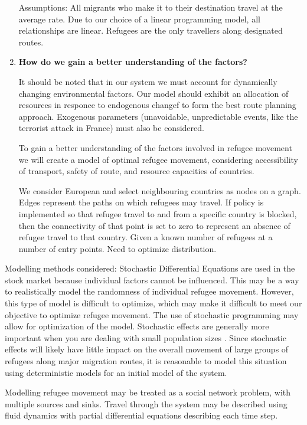 \documentclass{article}
\begin{document}
\begin{enumerate}
    Assumptions: All migrants who make it to their destination travel at the average rate. Due to our choice of a linear programming model, all relationships are linear. Refugees are the only travellers along designated routes.

    \item {\bf How do we gain a better understanding of the factors?}

    It should be noted that in our system we must account for dynamically changing environmental factors. Our model should exhibit an allocation of resources in responce to endogenous changef to form the best route planning approach. Exogenous parameters (unavoidable, unpredictable events, like the terrorist attack in France) must also be considered.

    To gain a better understanding of the factors involved in refugee movement we will create a model of optimal refugee movement, considering accessibility of transport, safety of route, and resource capacities of countries. 

    We consider European and select neighbouring countries as nodes on a graph. Edges represent the paths on which refugees may travel. If policy is implemented so that refugee travel to and from a specific country is blocked, then the connectivity of that point is set to zero to represent an absence of refugee travel to that country. Given a known number of refugees at a number of entry points. Need to optimize distribution.
\end{enumerate}

    Modelling methods considered:
    Stochastic Differential Equations are used in the stock market because individual factors cannot be influenced. This may be a way to realistically model the randomness of individual refugee movement. However, this type of model is difficult to optimize, which may make it difficult to meet our objective to optimize refugee movement. The use of stochastic programming may allow for optimization of the model. Stochastic effects are generally more important when you are dealing with small population sizes \cite{vries}. Since stochastic effects will likely have little impact on the overall movement of large groups of refugees along major migration routes, it is reasonable to model this situation using deterministic models for an initial model of the system.

    Modelling refugee movement may be treated as a social network problem, with multiple sources and sinks. Travel through the system may be described using fluid dynamics with partial differential equations describing each time step. 
\end{document}
